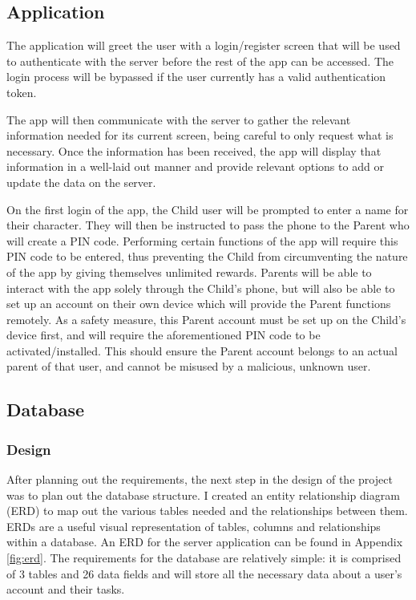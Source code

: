 \subsection{Application}
The application will greet the user with a login/register screen that will be used to authenticate with the server before the rest of the app can be accessed.
The login process will be bypassed if the user currently has a valid authentication token.

The app will then communicate with the server to gather the relevant information needed for its current screen, being careful to only request what is necessary.
Once the information has been received, the app will display that information in a well-laid out manner and provide relevant options to add or update the data on the server.

On the first login of the app, the Child user will be prompted to enter a name for their character. 
They will then be instructed to pass the phone to the Parent who will create a PIN code.
Performing certain functions of the app will require this PIN code to be entered, thus preventing the Child from circumventing the nature of the app by giving themselves unlimited rewards.
Parents will be able to interact with the app solely through the Child's phone, but will also be able to set up an account on their own device which will provide the Parent functions remotely.
As a safety measure, this Parent account must be set up on the Child's device first, and will require the aforementioned PIN code to be activated/installed. 
This should ensure the Parent account belongs to an actual parent of that user, and cannot be misused by a malicious, unknown user. 

\subsection{Database}
\subsubsection{Design}
After planning out the requirements, the next step in the design of the project was to plan out the database structure.
I created an entity relationship diagram (ERD) to map out the various tables needed and the relationships between them.
ERDs are a useful visual representation of tables, columns and relationships within a database.
An ERD for the server application can be found in Appendix \ref{fig:erd}.
The requirements for the database are relatively simple: it is comprised of 3 tables and 26 data fields and will store all the necessary data about a user's account and their tasks.

